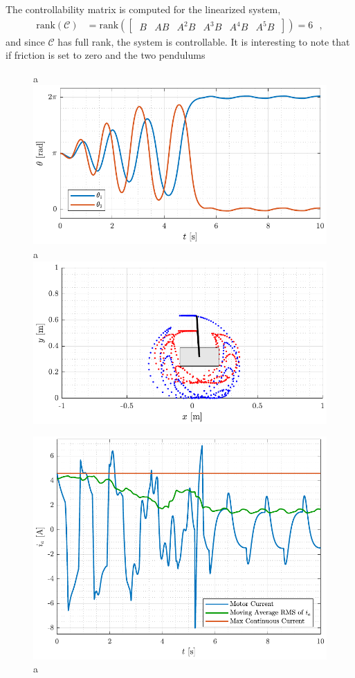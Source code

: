 %
The controllability matrix is computed for the linearized system,
\begin{align}
  \mathrm{rank}(\mathcal{C}) &= \mathrm{rank}([\ \begin{matrix} B & AB & A^2 B & A^3 B & A^4 B & A^5 B \end{matrix}\ ]) = 6  \ \ \ ,
\end{align}
and since $\mathcal{C}$ has full rank, the system is controllable. It is interesting to note that if friction is set to zero and the two pendulums 
%


\begin{figure}[H]
  \hspace{-10pt}
  \captionbox 
  {
    a
    \label{fig:theta_twinSwingAndCatch}
  }
  {
    \hspace{-1cm}
    \includegraphics[width=.46\textwidth]{figures/theta_twinSwingAndCatch}
  }
  \hspace{20pt}
  \captionbox 
  {
    a
    \label{fig:ani_twinSwingAndCatch}
  }
  {
    \hspace{-1cm}
    \includegraphics[width=.46\textwidth]{figures/ani_twinSwingAndCatch}
  }
\end{figure}
%
%
\begin{figure}[H]
  \includegraphics[width=.5\textwidth]{figures/ia_twinSwingAndCatch}
  \caption{a}
  \label{fig:ia_twinSwingAndCatch}
\end{figure}
